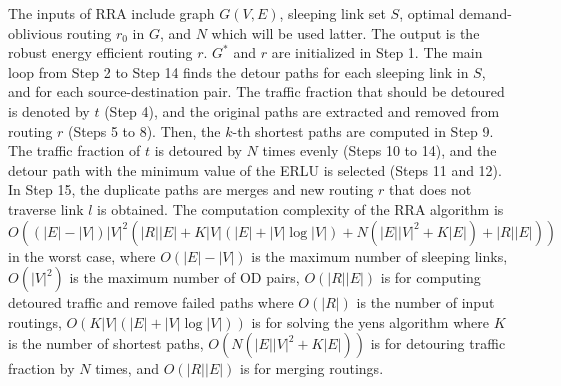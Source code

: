 \documentclass[conference]{IEEEtran}
\begin{document}
The inputs of RRA include graph $G(V,E)$, sleeping link set $S$, optimal demand-oblivious routing $r_0$ in $G$, and $N$ which will be used latter. The output is the robust energy efficient routing $r$. $G^*$ and $r$ are initialized in Step 1. The main loop from Step 2 to Step 14 finds the detour paths for each sleeping link in $S$, and for each source-destination pair. The traffic fraction that should be detoured is denoted by $t$ (Step 4), and the original paths are extracted and removed from routing $r$ (Steps 5 to 8). Then, the $k$-th shortest paths are computed in Step 9. The traffic fraction of $t$ is detoured by $N$ times evenly (Steps 10 to 14), and the detour path with the minimum value of the ERLU is selected (Steps 11 and 12). In Step 15, the duplicate paths are merges and new routing $r$ that does not traverse link $l$ is obtained. The computation complexity of the RRA algorithm is 
$O((|E|-|V|)|V|^2(|R||E| + K|V|(|E| + |V|\log|V|) + N(|E||V|^2 + K|E|) + |R||E|))$ in the worst case, where $O(|E|-|V|)$ is the maximum number of sleeping links, $O(|V|^2)$ is the maximum
number of OD pairs, $O(|R||E|)$ is for computing detoured traffic and remove failed paths where $O(|R|)$ is the number of input routings, $O(K|V|(|E| + |V|\log|V|))$ is for solving the 
yens algorithm where $K$ is the number of shortest paths, $O(N(|E||V|^2 + K|E|))$ is for detouring traffic fraction by $N$ times, and $O(|R||E|)$ is for merging routings.
\end{document}
